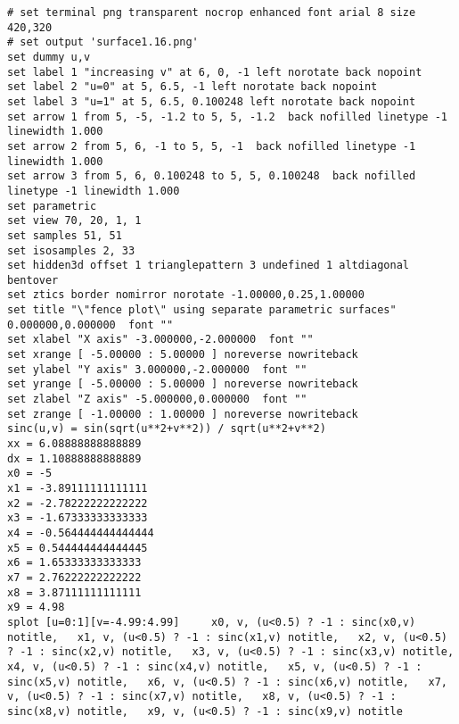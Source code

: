\begin{itemize}
\begin{verbatim}
# set terminal png transparent nocrop enhanced font arial 8 size 420,320 
# set output 'surface1.16.png'
set dummy u,v
set label 1 "increasing v" at 6, 0, -1 left norotate back nopoint
set label 2 "u=0" at 5, 6.5, -1 left norotate back nopoint
set label 3 "u=1" at 5, 6.5, 0.100248 left norotate back nopoint
set arrow 1 from 5, -5, -1.2 to 5, 5, -1.2  back nofilled linetype -1 linewidth 1.000
set arrow 2 from 5, 6, -1 to 5, 5, -1  back nofilled linetype -1 linewidth 1.000
set arrow 3 from 5, 6, 0.100248 to 5, 5, 0.100248  back nofilled linetype -1 linewidth 1.000
set parametric
set view 70, 20, 1, 1
set samples 51, 51
set isosamples 2, 33
set hidden3d offset 1 trianglepattern 3 undefined 1 altdiagonal bentover
set ztics border nomirror norotate -1.00000,0.25,1.00000
set title "\"fence plot\" using separate parametric surfaces" 0.000000,0.000000  font ""
set xlabel "X axis" -3.000000,-2.000000  font ""
set xrange [ -5.00000 : 5.00000 ] noreverse nowriteback
set ylabel "Y axis" 3.000000,-2.000000  font ""
set yrange [ -5.00000 : 5.00000 ] noreverse nowriteback
set zlabel "Z axis" -5.000000,0.000000  font ""
set zrange [ -1.00000 : 1.00000 ] noreverse nowriteback
sinc(u,v) = sin(sqrt(u**2+v**2)) / sqrt(u**2+v**2)
xx = 6.08888888888889
dx = 1.10888888888889
x0 = -5
x1 = -3.89111111111111
x2 = -2.78222222222222
x3 = -1.67333333333333
x4 = -0.564444444444444
x5 = 0.544444444444445
x6 = 1.65333333333333
x7 = 2.76222222222222
x8 = 3.87111111111111
x9 = 4.98
splot [u=0:1][v=-4.99:4.99] 	x0, v, (u<0.5) ? -1 : sinc(x0,v) notitle, 	x1, v, (u<0.5) ? -1 : sinc(x1,v) notitle, 	x2, v, (u<0.5) ? -1 : sinc(x2,v) notitle, 	x3, v, (u<0.5) ? -1 : sinc(x3,v) notitle, 	x4, v, (u<0.5) ? -1 : sinc(x4,v) notitle, 	x5, v, (u<0.5) ? -1 : sinc(x5,v) notitle, 	x6, v, (u<0.5) ? -1 : sinc(x6,v) notitle, 	x7, v, (u<0.5) ? -1 : sinc(x7,v) notitle, 	x8, v, (u<0.5) ? -1 : sinc(x8,v) notitle, 	x9, v, (u<0.5) ? -1 : sinc(x9,v) notitle
\end{verbatim}


\end{itemize}
